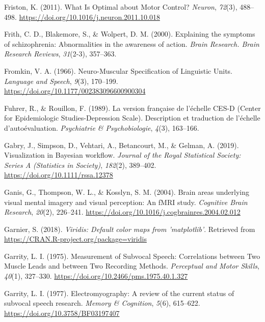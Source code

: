 \documentclass[a4paper,12pt,twoside,openright,oldfontcommands,final]{memoir}
\begin{document}
\leavevmode\hypertarget{ref-friston_what_2011}{}%
Friston, K. (2011). What Is Optimal about Motor Control? \emph{Neuron}, \emph{72}(3), 488--498. \url{https://doi.org/10.1016/j.neuron.2011.10.018}

\leavevmode\hypertarget{ref-frith_explaining_2000}{}%
Frith, C. D., Blakemore, S., \& Wolpert, D. M. (2000). Explaining the symptoms of schizophrenia: Abnormalities in the awareness of action. \emph{Brain Research. Brain Research Reviews}, \emph{31}(2-3), 357--363.

\leavevmode\hypertarget{ref-fromkin_neuro-muscular_1966}{}%
Fromkin, V. A. (1966). Neuro-Muscular Specification of Linguistic Units. \emph{Language and Speech}, \emph{9}(3), 170--199. \url{https://doi.org/10.1177/002383096600900304}

\leavevmode\hypertarget{ref-fuhrer_version_1989}{}%
Fuhrer, R., \& Rouillon, F. (1989). La version française de l'échelle CES-D (Center for Epidemiologic Studies-Depression Scale). Description et traduction de l'échelle d'autoévaluation. \emph{Psychiatrie \& Psychobiologie}, \emph{4}(3), 163--166.

\leavevmode\hypertarget{ref-gabry_visualization_2019}{}%
Gabry, J., Simpson, D., Vehtari, A., Betancourt, M., \& Gelman, A. (2019). Visualization in Bayesian workflow. \emph{Journal of the Royal Statistical Society: Series A (Statistics in Society)}, \emph{182}(2), 389--402. \url{https://doi.org/10.1111/rssa.12378}

\leavevmode\hypertarget{ref-ganis_brain_2004}{}%
Ganis, G., Thompson, W. L., \& Kosslyn, S. M. (2004). Brain areas underlying visual mental imagery and visual perception: An fMRI study. \emph{Cognitive Brain Research}, \emph{20}(2), 226--241. \url{https://doi.org/10.1016/j.cogbrainres.2004.02.012}

\leavevmode\hypertarget{ref-R-viridis}{}%
Garnier, S. (2018). \emph{Viridis: Default color maps from 'matplotlib'}. Retrieved from \url{https://CRAN.R-project.org/package=viridis}

\leavevmode\hypertarget{ref-garrity_measurement_1975}{}%
Garrity, L. I. (1975). Measurement of Subvocal Speech: Correlations between Two Muscle Leads and between Two Recording Methods. \emph{Perceptual and Motor Skills}, \emph{40}(1), 327--330. \url{https://doi.org/10.2466/pms.1975.40.1.327}

\leavevmode\hypertarget{ref-garrity_electromyography_1977}{}%
Garrity, L. I. (1977). Electromyography: A review of the current status of subvocal speech research. \emph{Memory \& Cognition}, \emph{5}(6), 615--622. \url{https://doi.org/10.3758/BF03197407}
\end{document}
